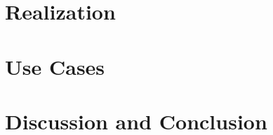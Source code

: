 \documentclass[journal]{vgtc}                %
\begin{document}
\section{Realization}



\section{Use Cases}


\section{Discussion and Conclusion}





\end{document}
